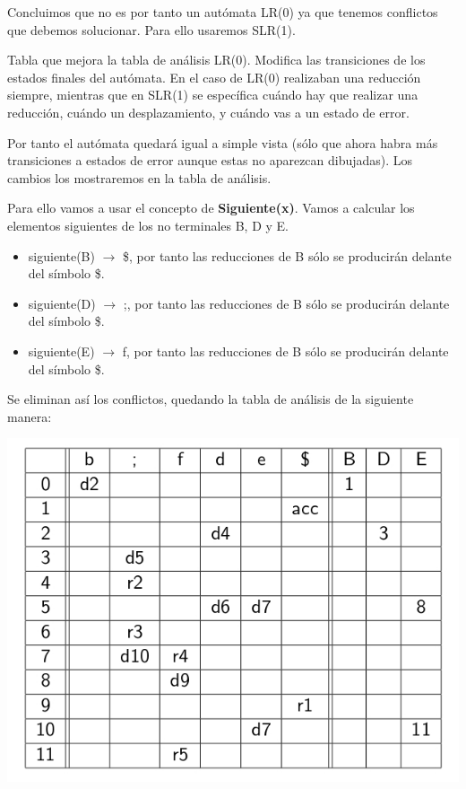 \documentclass{apuntes}
\begin{document}
\begin{example}
Concluimos que no es por tanto un autómata LR(0) ya que tenemos conflictos que debemos solucionar. Para ello usaremos SLR(1).

\begin{defn}
Tabla que mejora la tabla de análisis LR(0). Modifica las transiciones de los estados finales del autómata. En el caso de LR(0) realizaban una reducción siempre, mientras que en SLR(1) se específica cuándo hay que realizar una reducción, cuándo un desplazamiento, y cuándo vas  a un estado de error.
\end{defn}

Por tanto el autómata quedará igual a simple vista (sólo que ahora habra más transiciones a estados de error aunque estas no aparezcan dibujadas). Los cambios los mostraremos en la tabla de análisis.

Para ello vamos a usar el concepto de \textbf{Siguiente(x)}. Vamos a calcular los elementos siguientes de los no terminales B, D y E.

\begin{itemize}
\item siguiente(B) $\rightarrow$ {\$}, por tanto las reducciones de B sólo se producirán delante del símbolo \$.
\item siguiente(D) $\rightarrow$ {;}, por tanto las reducciones de B sólo se producirán delante del símbolo \$.
\item siguiente(E) $\rightarrow$ {f}, por tanto las reducciones de B sólo se producirán delante del símbolo \$.
\end{itemize}

Se eliminan así los conflictos, quedando la tabla de análisis de la siguiente manera:
 
\begin{center}
\includegraphics[scale=0.4]{img/tablaanalisisslr1.jpg}
\end{center}


\end{example}
\end{document}
